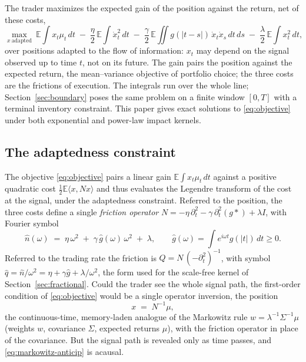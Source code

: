 \documentclass[11pt]{article}
\newcommand{\E}{\mathbb{E}}
\theoremstyle{plain}
\theoremstyle{definition}
\theoremstyle{remark}
\begin{document}
The trader maximizes the expected gain of the position against the return, net of these costs,
\begin{equation}\label{eq:objective}
\max_{x\ \text{adapted}}\ \E\!\int x_t\mu_t\,dt
\;-\; \frac{\eta}{2}\,\E\!\int \dot x_t^2\,dt
\;-\; \frac{\gamma}{2}\,\E\!\iint g(|t-s|)\,\dot x_t \dot x_s\,dt\,ds
\;-\; \frac{\lambda}{2}\,\E\!\int x_t^2\,dt ,
\end{equation}
over positions adapted to the flow of information: $x_t$ may depend on the signal observed up to time $t$, not on its future. The gain pairs the position against the expected return, the mean--variance objective of portfolio choice; the three costs are the frictions of execution. The integrals run over the whole line; Section~\ref{sec:boundary} poses the same problem on a finite window $[0,T]$ with a terminal inventory constraint. This paper gives exact solutions to \eqref{eq:objective} under both exponential and power-law impact kernels.

\subsection{The adaptedness constraint}\label{sec:adaptedness}

The objective \eqref{eq:objective} pairs a linear gain $\E\int x_t\mu_t\,dt$ against a positive quadratic cost $\tfrac12\E\langle x,Nx\rangle$ and thus evaluates the Legendre transform of the cost at the signal, under the adaptedness constraint. Referred to the position, the three costs define a single \emph{friction operator} $N=-\eta\,\partial_t^2-\gamma\,\partial_t^2(g\ast)+\lambda I$, with Fourier symbol
\begin{equation}\label{eq:symbol}
\hat n(\omega) \;=\; \eta\,\omega^2 \;+\; \gamma\,\hat g(\omega)\,\omega^2 \;+\; \lambda,
\qquad \hat g(\omega) = \int e^{i\omega t}g(|t|)\,dt \ge 0.
\end{equation}
Referred to the trading rate the friction is $Q=N\,(-\partial_t^2)^{-1}$, with symbol $\hat q=\hat n/\omega^2=\eta+\gamma\hat g+\lambda/\omega^2$, the form used for the scale-free kernel of Section~\ref{sec:fractional}. Could the trader see the whole signal path, the first-order condition of \eqref{eq:objective} would be a single operator inversion, the position
\begin{equation}\label{eq:markowitz-anticip}
x \;=\; N^{-1}\mu,
\end{equation}
the continuous-time, memory-laden analogue of the Markowitz rule $w=\lambda^{-1}\Sigma^{-1}\mu$ (weights $w$, covariance $\Sigma$, expected returns $\mu$), with the friction operator in place of the covariance. But the signal path is revealed only as time passes, and \eqref{eq:markowitz-anticip} is acausal.
\end{document}
